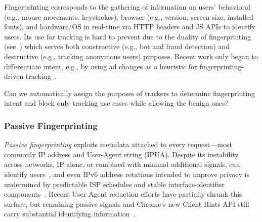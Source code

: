 %
Fingerprinting corresponds to the gathering of information on users’ behavioral (e.g., mouse movements, keystrokes), browser (e.g., version, screen size, installed fonts), and hardware/OS in real-time via HTTP headers and JS APIs to identify users.
%
%
Its use for tracking is hard to prevent due to the duality of fingerprinting (see~) which serves both constructive (e.g., bot and fraud detection) and destructive (e.g., tracking anonymous users) purposes. 
%
Recent work only began to differentiate intent, e.g., by using ad changes as a heuristic for fingerprinting-driven tracking~\cite{liuFirstEarlyEvidence2025}.

\begin{opbox}
Can we automatically assign the purposes of trackers to determine fingerprinting intent and block only tracking use cases while allowing the benign ones?
\end{opbox}



\subsubsection{Passive Fingerprinting} 
\label{sec:stateless-techniques-passive-fingperinting}
%
\textit{Passive fingerprinting} exploits metadata attached to every request---most commonly IP address and User-Agent string (IPUA).
%
Despite its instability across networks, IP alone, or combined with minimal additional signals, can identify users~\cite{mishraDontCountMe2020,klineStructureCharacteristicsUser2017}, and even IPv6 address rotations intended to improve privacy is undermined by predictable ISP schedules and stable interface-identifier components~\cite{ryeFollowScentDefeating2021}.
%
Recent User-Agent reduction efforts have partially shrunk this surface, but remaining passive signals and Chrome's new Client Hints API still carry substantial identifying information~\cite{eckersleyHowUniqueYour2010,senolUnveilingImpactUserAgent2023,wieflingPrivacyMeasureTurned2024}.



